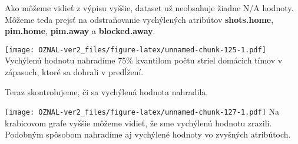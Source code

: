 \documentclass[
]{article}
\newenvironment{Shaded}{\begin{snugshade}}{\end{snugshade}}
\newcommand{\AttributeTok}[1]{\textcolor[rgb]{0.77,0.63,0.00}{#1}}
\newcommand{\DecValTok}[1]{\textcolor[rgb]{0.00,0.00,0.81}{#1}}
\newcommand{\FloatTok}[1]{\textcolor[rgb]{0.00,0.00,0.81}{#1}}
\newcommand{\FunctionTok}[1]{\textcolor[rgb]{0.00,0.00,0.00}{#1}}
\newcommand{\NormalTok}[1]{#1}
\newcommand{\OtherTok}[1]{\textcolor[rgb]{0.56,0.35,0.01}{#1}}
\newcommand{\SpecialCharTok}[1]{\textcolor[rgb]{0.00,0.00,0.00}{#1}}
\newcommand{\StringTok}[1]{\textcolor[rgb]{0.31,0.60,0.02}{#1}}
\begin{document}
Ako môžeme vidieť z výpisu vyššie, dataset už neobsahuje žiadne N/A
hodnoty. Môžeme teda prejsť na odstraňovanie vychýlených atribútov
\textbf{shots.home}, \textbf{pim.home}, \textbf{pim.away} a
\textbf{blocked.away}.

\begin{Shaded}
\end{Shaded}

\texttt{[image: OZNAL-ver2\_files/figure-latex/unnamed-chunk-125-1.pdf]}
Vychýlenú hodnotu nahradíme 75\% kvantilom počtu striel domácich tímov v
zápasoch, ktoré sa dohrali v predĺžení.

\begin{Shaded}
\end{Shaded}

Teraz skontrolujeme, či sa vychýlená hodnota nahradila.

\begin{Shaded}
\end{Shaded}

\texttt{[image: OZNAL-ver2\_files/figure-latex/unnamed-chunk-127-1.pdf]}
Na krabicovom grafe vyššie môžeme vidieť, že sme vychýlenú hodnotu
zrazili. Podobným spôsobom nahradíme aj vychýlené hodnoty vo zvyšných
atribútoch.
\end{document}
